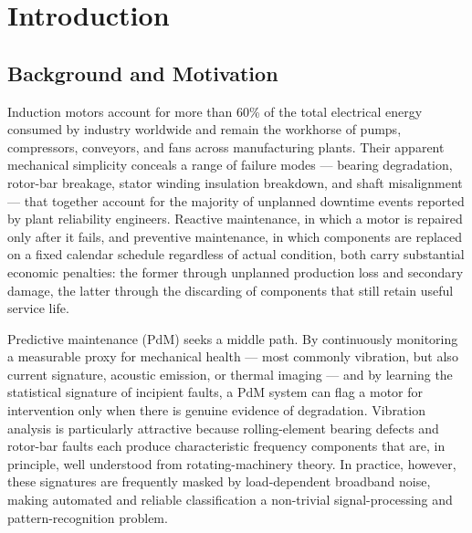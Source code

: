 \documentclass[12pt,a4paper]{report}
\begin{document}
\clearpage
\pagestyle{fancy}

\chapter{Introduction}
\label{ch:intro}

\section{Background and Motivation}
Induction motors account for more than 60\% of the total electrical energy consumed by industry
worldwide and remain the workhorse of pumps, compressors, conveyors, and fans across
manufacturing plants. Their apparent mechanical simplicity conceals a range of failure modes ---
bearing degradation, rotor-bar breakage, stator winding insulation breakdown, and shaft
misalignment --- that together account for the majority of unplanned downtime events reported by
plant reliability engineers. Reactive maintenance, in which a motor is repaired only after it
fails, and preventive maintenance, in which components are replaced on a fixed calendar
schedule regardless of actual condition, both carry substantial economic penalties: the former
through unplanned production loss and secondary damage, the latter through the discarding of
components that still retain useful service life.

Predictive maintenance (PdM) seeks a middle path. By continuously monitoring a measurable proxy
for mechanical health --- most commonly vibration, but also current signature, acoustic
emission, or thermal imaging --- and by learning the statistical signature of incipient faults,
a PdM system can flag a motor for intervention only when there is genuine evidence of
degradation. Vibration analysis is particularly attractive because rolling-element bearing
defects and rotor-bar faults each produce characteristic frequency components that are, in
principle, well understood from rotating-machinery theory. In practice, however, these
signatures are frequently masked by load-dependent broadband noise, making automated and
reliable classification a non-trivial signal-processing and pattern-recognition problem.
\end{document}
